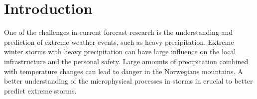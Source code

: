 \chapter{Introduction}
\label{ch:intro}
One of the challenges in current forecast research is the understanding and prediction of extreme weather events, such as heavy precipitation. 
Extreme winter storms with heavy precipitation can have large influence on the local infrastructure and the personal safety. Large amounts of precipitation combined with temperature changes can lead to danger in the Norwegians mountains. A better understanding of the microphysical processes in storms in crucial to better predict extreme storms. 
\\
